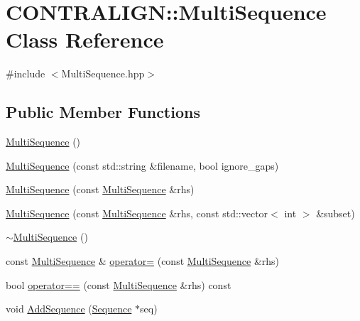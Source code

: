 \hypertarget{class_c_o_n_t_r_a_l_i_g_n_1_1_multi_sequence}{\section{C\+O\+N\+T\+R\+A\+L\+I\+G\+N\+:\+:Multi\+Sequence Class Reference}
\label{class_c_o_n_t_r_a_l_i_g_n_1_1_multi_sequence}
}


{\ttfamily \#include $<$Multi\+Sequence.\+hpp$>$}

\subsection*{Public Member Functions}
\begin{DoxyCompactItemize}
\item 
\hyperlink{class_c_o_n_t_r_a_l_i_g_n_1_1_multi_sequence_afc3a4a7ef8d8a76369e1206319601730}{Multi\+Sequence} ()
\item 
\hyperlink{class_c_o_n_t_r_a_l_i_g_n_1_1_multi_sequence_a6a67ce64d529b7464282dd31c8746dd8}{Multi\+Sequence} (const std\+::string \&filename, bool ignore\+\_\+gaps)
\item 
\hyperlink{class_c_o_n_t_r_a_l_i_g_n_1_1_multi_sequence_a810607a265158676ab7c8d8f2a2f2852}{Multi\+Sequence} (const \hyperlink{class_c_o_n_t_r_a_l_i_g_n_1_1_multi_sequence}{Multi\+Sequence} \&rhs)
\item 
\hyperlink{class_c_o_n_t_r_a_l_i_g_n_1_1_multi_sequence_a1269476d72bea0e935915599dca05ede}{Multi\+Sequence} (const \hyperlink{class_c_o_n_t_r_a_l_i_g_n_1_1_multi_sequence}{Multi\+Sequence} \&rhs, const std\+::vector$<$ int $>$ \&subset)
\item 
\hyperlink{class_c_o_n_t_r_a_l_i_g_n_1_1_multi_sequence_a7096657bee43706ba528786840ce22c4}{$\sim$\+Multi\+Sequence} ()
\item 
const \hyperlink{class_c_o_n_t_r_a_l_i_g_n_1_1_multi_sequence}{Multi\+Sequence} \& \hyperlink{class_c_o_n_t_r_a_l_i_g_n_1_1_multi_sequence_a7b06f7ae3d4d08fa74849b371e1b6896}{operator=} (const \hyperlink{class_c_o_n_t_r_a_l_i_g_n_1_1_multi_sequence}{Multi\+Sequence} \&rhs)
\item 
bool \hyperlink{class_c_o_n_t_r_a_l_i_g_n_1_1_multi_sequence_a6ae3658b56c6a314b0286b55ac26666e}{operator==} (const \hyperlink{class_c_o_n_t_r_a_l_i_g_n_1_1_multi_sequence}{Multi\+Sequence} \&rhs) const 
\item 
void \hyperlink{class_c_o_n_t_r_a_l_i_g_n_1_1_multi_sequence_a20c9deb692ae0314c18b20de88543bc5}{Add\+Sequence} (\hyperlink{class_c_o_n_t_r_a_l_i_g_n_1_1_sequence}{Sequence} $\ast$seq)

\end{DoxyCompactItemize}
